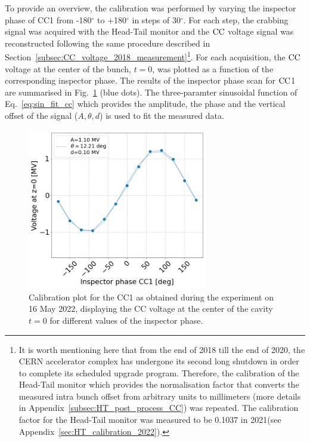 To provide an overview, the calibration was performed by varying the inspector phase of CC1 from -180$^\circ$ to +180$^\circ$ in steps of 30$^\circ$. For each step, the crabbing signal was acquired with the Head-Tail monitor and the ${\mathrm{CC}}$ voltage signal was reconstructed following the same procedure described in Section~\ref{subsec:CC_voltage_2018_measurement}\footnote{It is worth mentioning here that from the end of 2018 till the end of 2020, the CERN accelerator complex has undergone its second long shutdown in order to complete its scheduled upgrade program. Therefore, the calibration of the Head-Tail monitor which provides the normalisation factor that converts the measured intra bunch offset from arbitrary units to millimeters (more details in Appendix~\ref{subsec:HT_post_process_CC}) was repeated. The calibration factor for the Head-Tail monitor was measured to be 0.1037 in 2021(see Appendix~\ref{sec:HT_calibration_2022}).}. For each acquisition, the ${\mathrm{CC}}$ voltage at the center of the bunch, $t=0$, was plotted as a function of the corresponding inspector phase. The results of the inspector phase scan for ${\mathrm{CC}}$1 are summarised in Fig.~\ref{fig:Vcc_calibration_md_2022} (blue dots). 
The three-paramter sinusoidal function of Eq.~\eqref{eq:sin_fit_cc} which provides the amplitude, the phase and the vertical offset of the signal ($A, \theta, d$) is used to fit the measured data.



\begin{figure}[!h] %
   \centering         
   \includegraphics[width=0.7\textwidth]{images/Ch8/Vcc_at_z_zero_vs_inspector_phase_CC1_for_thesis.png}
       \caption{Calibration plot for the CC1 as obtained during the experiment on 16 May 2022, displaying the CC voltage at the center of the cavity $t=0$ for different values of the inspector phase.}
       \label{fig:Vcc_calibration_md_2022}
\end{figure}


